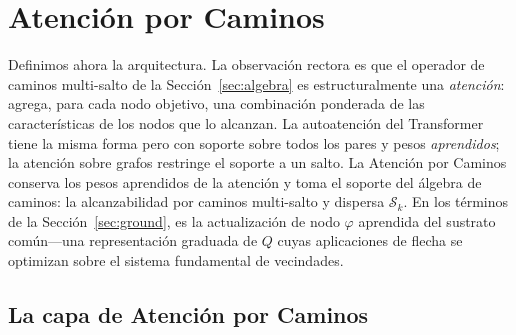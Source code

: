 \section{Atención por Caminos}\label{sec:model}

Definimos ahora la arquitectura. La observación rectora es que el
operador de caminos multi-salto de la Sección~\ref{sec:algebra} es estructuralmente una
\emph{atención}: agrega, para cada nodo objetivo, una combinación ponderada de
las características de los nodos que lo alcanzan. La autoatención del Transformer
\cite{vaswani2017attention} tiene la misma forma pero con soporte sobre todos los pares y
pesos \emph{aprendidos}; la atención sobre grafos \cite{velickovic2017graph} restringe el
soporte a un salto. La Atención por Caminos conserva los pesos aprendidos de la atención y
toma el soporte del álgebra de caminos: la alcanzabilidad por caminos multi-salto y dispersa
$\mathcal{S}_k$. En los términos de la Sección~\ref{sec:ground}, es la
actualización de nodo $\varphi$ aprendida del sustrato común---una representación
graduada de $Q$ cuyas aplicaciones de flecha se optimizan sobre el sistema
fundamental de vecindades.

\subsection{La capa de Atención por Caminos}

